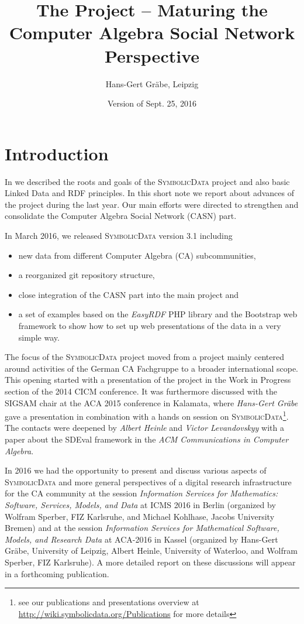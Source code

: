 \documentclass[a4paper,11pt]{article}
\title{The {\SD} Project -- Maturing the Computer Algebra Social Network
  Perspective}
\author{Hans-Gert Gr\"abe, Leipzig}
\date{Version of Sept. 25, 2016}
\def\SD{\textsc{SymbolicData}}
\begin{document}
\maketitle

\section{Introduction}

In \cite{car-55,cicm-14,icms-16,aca-16} we described the roots and goals of the
{\SD} project and also basic Linked Data and RDF principles.  In
this short note we report about advances of the project during the last year.
Our main efforts were directed to strengthen and consolidate the Computer
Algebra Social Network (CASN) part.

In March 2016, we released {\SD} version 3.1 including
\begin{itemize}
\item new data from
different Computer Algebra (CA)
subcommunities,
\item a reorganized git repository structure,
\item close integration of the CASN
part into the main project and
\item a set of examples based on the \emph{EasyRDF}
PHP library and the Bootstrap web framework to show how to set up web
presentations of the data in a very simple way.
\end{itemize}

The focus of the {\SD} project moved from a project mainly centered around
activities of the German CA Fachgruppe to a broader international scope. This
opening started with a presentation of the project in the Work in Progress
section of the 2014 CICM conference. It was furthermore discussed with the SIGSAM chair at
the ACA 2015 conference in Kalamata, where {\emph{Hans-Gert Gr\"abe}} gave a
presentation in combination with a hands on session on {\SD}\footnote{see our publications and
presentations overview at
  \url{http://wiki.symbolicdata.org/Publications} for more details}.  The
contacts were deepened by \emph{Albert Heinle} and \emph{Victor Levandovskyy}
with a paper \cite{heinle-15} about the SDEval framework in the \emph{ACM
  Communications in Computer Algebra}.

In 2016 we had the opportunity to present and discuss various aspects of {\SD}
and more general perspectives of a digital research infrastructure for the CA
community at the session \emph{Information Services for Mathematics: Software,
  Services, Models, and Data} at ICMS 2016 in Berlin (organized by Wolfram
Sperber, FIZ Karlsruhe, and Michael Kohlhase, Jacobs University Bremen) and at
the session \emph{Information Services for Mathematical Software, Models, and
  Research Data} at ACA-2016 in Kassel (organized by Hans-Gert Gr\"abe,
University of Leipzig, Albert Heinle, University of Waterloo, and Wolfram
Sperber, FIZ Karlsruhe).  A more detailed report on these discussions will
appear in a forthcoming publication.
\end{document}
